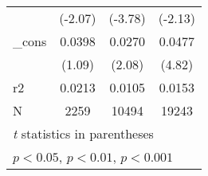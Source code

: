 \begin{table}[htbp]
\begin{tabular}{l*{3}{c}}
            &     (-2.07)         &     (-3.78)         &     (-2.13)         \\
[1em]
\_cons      &      0.0398         &      0.0270\sym{*}  &      0.0477\sym{***}\\
            &      (1.09)         &      (2.08)         &      (4.82)         \\
\hline
r2          &      0.0213         &      0.0105         &      0.0153         \\
N           &        2259         &       10494         &       19243         \\
\hline\hline
\multicolumn{4}{l}{\footnotesize \textit{t} statistics in parentheses}\\
\multicolumn{4}{l}{\footnotesize \sym{*} \(p<0.05\), \sym{**} \(p<0.01\), \sym{***} \(p<0.001\)}\\
\end{tabular}
\end{table}
